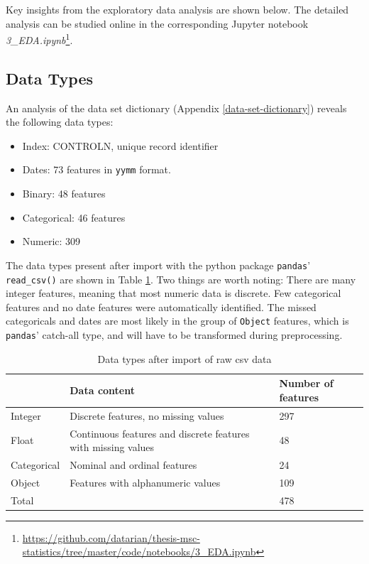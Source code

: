 \documentclass[
  11pt,
  a4paper,
  DIV=12,captions=tableheading,oneside,titlepage]{scrbook}
\providecommand{\tightlist}{%
  \setlength{\itemsep}{0pt}\setlength{\parskip}{0pt}}
\begin{document}
Key insights from the exploratory data analysis are shown below. The detailed analysis can be studied online in the corresponding Jupyter notebook \emph{3\_EDA.ipynb}\footnote{\url{https://github.com/datarian/thesis-msc-statistics/tree/master/code/notebooks/3_EDA.ipynb}}.

\hypertarget{data-types}{%
\subsection{Data Types}\label{data-types}}

An analysis of the data set dictionary (Appendix \ref{data-set-dictionary}) reveals the following data types:

\begin{itemize}
\tightlist
\item
  Index: CONTROLN, unique record identifier
\item
  Dates: 73 features in \texttt{yymm} format.
\item
  Binary: 48 features
\item
  Categorical: 46 features
\item
  Numeric: 309
\end{itemize}

The data types present after import with the python package \texttt{pandas}' \texttt{read\_csv()} are shown in Table \ref{tab:data-desc}. Two things are worth noting: There are many integer features, meaning that most numeric data is discrete. Few categorical features and no date features were automatically identified. The missed categoricals and dates are most likely in the group of \texttt{Object} features, which is \texttt{pandas}' catch-all type, and will have to be transformed during preprocessing.

\begin{table}[!h]

\caption{\label{tab:data-desc}Data types after import of raw csv data}
\centering
\begin{tabular}{l>{\raggedright\arraybackslash}p{6cm}l}
\toprule
  & Data content & Number of features\\
\midrule
Integer & Discrete features, no missing values & 297\\
Float & Continuous features and discrete features with missing values & 48\\
Categorical & Nominal and ordinal features & 24\\
Object & Features with alphanumeric values & 109\\
Total &  & 478\\
\bottomrule
\end{tabular}
\end{table}
\end{document}
